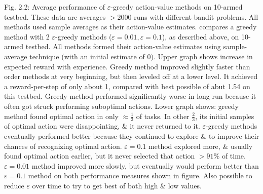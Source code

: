 \documentclass{article}
\begin{document}
\begin{itemize}
\begin{itemize}
        {\sf Fig. 2.2: Average performance of $\varepsilon$-greedy action-value methods on 10-armed testbed. These data are averages $> 2000$ runs with different bandit problems. All methods used sample averages as their action-value estimates.} compares a greedy method with 2 $\varepsilon$-greedy methods ($\varepsilon = 0.01,\varepsilon = 0.1$), as described above, on 10-armed testbed. All methods formed their action-value estimates using sample-average technique (with an initial estimate of 0). Upper graph shows increase in expected reward with experience. Greedy method improved slightly faster than order methods at very beginning, but then leveled off at a lower level. It achieved a reward-per-step of only about 1, compared with best possible of abut 1.54 on this testbed. Greedy method performed significantly worse in long run because it often got struck performing suboptimal actions. Lower graph shows: greedy method found optimal action in only $\approx\frac{1}{3}$ of tasks. In other $\frac{2}{3}$, its initial samples of optimal action were disappointing, \& it never returned to it. $\varepsilon$-greedy methods eventually performed better because they continued to explore \& to improve their chances of recognizing optimal action. $\varepsilon = 0.1$ method explored more, \& usually found optimal action earlier, but it never selected that action $> 91\%$ of time. $\varepsilon = 0.01$ method improved more slowly, but eventually would perform better than $\varepsilon = 0.1$ method on both performance measures shown in figure. Also possible to reduce $\varepsilon$ over time to try to get best of both high \& low values.


\end{itemize}
\end{itemize}
\end{document}
